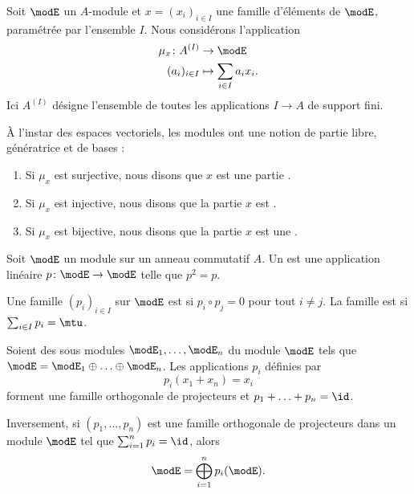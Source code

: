 Soit \( \modE\) un \( A\)-module et \( x=(x_i)_{i\in I}\) une famille d'éléments de \( \modE\), paramétrée par l'ensemble \( I\). Nous considérons l'application
\begin{equation}
    \begin{aligned}
        \mu_x\colon A^{(I)}&\to \modE \\
        (a_i)_{i\in I}&\mapsto \sum_{i\in I}a_ix_i.
    \end{aligned}
\end{equation}
Ici \( A^{(I)}\) désigne l'ensemble de toutes les applications \( I\to A\) de support fini.  

\begin{definition}      \label{DefBasePouyKj}
    À l'instar des espaces vectoriels, les modules ont une notion de partie libre, génératrice et de bases :
    \begin{enumerate}
        \item
            Si \( \mu_x\) est surjective, nous disons que \( x\) est une partie .
        \item
            Si \( \mu_x\) est injective, nous disons que la partie \( x\) est .
        \item
            Si \( \mu_x\) est bijective, nous disons que la partie \( x\) est une .
    \end{enumerate}
\end{definition}

\begin{definition}
    Soit \( \modE\) un module sur un anneau commutatif \( A\). Un  est une application linéaire \( p\colon \modE\to \modE\) telle que \( p^2=p\).

    Une famille \( (p_i)_{i\in I}\) sur \( \modE\) est  si \( p_i\circ p_j=0\) pour tout \( i\neq j\). La famille est  si \( \sum_{i\in I}p_i=\mtu\).
\end{definition}

\begin{theorem}     \label{ThoProjModpAlsUR}
    Soient des sous modules \( \modE_1,\ldots,\modE_n\) du module \( \modE\) tels que \( \modE=\modE_1\oplus\ldots\oplus\modE_n\). Les applications \( p_i\) définies par
    \begin{equation}
        p_i(x_1+x_n)=x_i
    \end{equation}
    forment une famille orthogonale de projecteurs et \( p_1+\ldots +p_n=\id\).

    Inversement, si \( (p_1,\ldots, p_n)\) est une famille orthogonale de projecteurs dans un module \( \modE\) tel que \( \sum_{i=1}^np_i=\id\), alors
    \begin{equation}
        \modE=\bigoplus_{i=1}^np_i(\modE).
    \end{equation}
\end{theorem}

